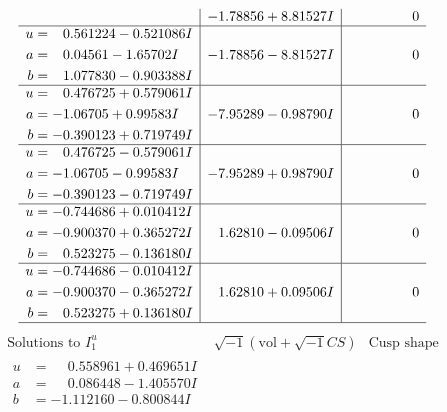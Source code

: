 \documentclass[1p]{elsarticle_modified}
\theoremstyle{definition}
\newcommand{\I}{\sqrt{-1}}
\begin{document}
$$\begin{array}{c|c|c}
 & -1.78856 + 8.81527 I & \phantom{-0.000000 } 0 \\ \hline\begin{aligned}
u &= \phantom{-}0.561224 - 0.521086 I \\
a &= \phantom{-}0.04561 - 1.65702 I \\
b &= \phantom{-}1.077830 - 0.903388 I\end{aligned}
 & -1.78856 - 8.81527 I & \phantom{-0.000000 } 0 \\ \hline\begin{aligned}
u &= \phantom{-}0.476725 + 0.579061 I \\
a &= -1.06705 + 0.99583 I \\
b &= -0.390123 + 0.719749 I\end{aligned}
 & -7.95289 - 0.98790 I & \phantom{-0.000000 } 0 \\ \hline\begin{aligned}
u &= \phantom{-}0.476725 - 0.579061 I \\
a &= -1.06705 - 0.99583 I \\
b &= -0.390123 - 0.719749 I\end{aligned}
 & -7.95289 + 0.98790 I & \phantom{-0.000000 } 0 \\ \hline\begin{aligned}
u &= -0.744686 + 0.010412 I \\
a &= -0.900370 + 0.365272 I \\
b &= \phantom{-}0.523275 - 0.136180 I\end{aligned}
 & \phantom{-}1.62810 - 0.09506 I & \phantom{-0.000000 } 0 \\ \hline\begin{aligned}
u &= -0.744686 - 0.010412 I \\
a &= -0.900370 - 0.365272 I \\
b &= \phantom{-}0.523275 + 0.136180 I\end{aligned}
 & \phantom{-}1.62810 + 0.09506 I & \phantom{-0.000000 } 0\\
 \hline 
 \end{array}$$\newpage$$\begin{array}{c|c|c}  
\text{Solutions to }I^u_{1}& \I (\text{vol} + \sqrt{-1}CS) & \text{Cusp shape}\\
 \hline 
\begin{aligned}
u &= \phantom{-}0.558961 + 0.469651 I \\
a &= \phantom{-}0.086448 - 1.405570 I \\
b &= -1.112160 - 0.800844 I\end{aligned}

\end{array}$$
\end{document}

